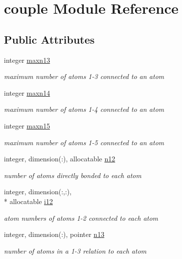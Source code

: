\hypertarget{classcouple}{\section{couple Module Reference}
\label{classcouple}
}
\subsection*{Public Attributes}
\begin{DoxyCompactItemize}
\item 
integer \hyperlink{classcouple_a55c701f41c3dfc521a4d81f8a9fd2428}{maxn13}
\begin{DoxyCompactList}\small\item\em maximum number of atoms 1-\/3 connected to an atom \end{DoxyCompactList}\item 
integer \hyperlink{classcouple_a6bbc2e8cd4cc6c99d894b1a7f1836a5c}{maxn14}
\begin{DoxyCompactList}\small\item\em maximum number of atoms 1-\/4 connected to an atom \end{DoxyCompactList}\item 
integer \hyperlink{classcouple_a8331c931feb69d1344b060e56c39ffc0}{maxn15}
\begin{DoxyCompactList}\small\item\em maximum number of atoms 1-\/5 connected to an atom \end{DoxyCompactList}\item 
integer, dimension(\-:), allocatable \hyperlink{classcouple_a2025c182a6107594cd04f5d91f893277}{n12}
\begin{DoxyCompactList}\small\item\em number of atoms directly bonded to each atom \end{DoxyCompactList}\item 
integer, dimension(\-:,\-:), \\*
allocatable \hyperlink{classcouple_aadf31ce6a0e91d1f81d2eafb838e8cd9}{i12}
\begin{DoxyCompactList}\small\item\em atom numbers of atoms 1-\/2 connected to each atom \end{DoxyCompactList}\item 
integer, dimension(\-:), pointer \hyperlink{classcouple_a21ee5069565c0019cc91f6ced7ffe92d}{n13}
\begin{DoxyCompactList}\small\item\em number of atoms in a 1-\/3 relation to each atom \end{DoxyCompactList}\item 

\end{DoxyCompactItemize}
